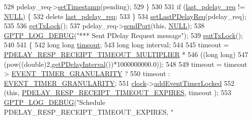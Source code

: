 \begin{DoxyCode}
528                 pdelay\_req->\hyperlink{class_p_t_p_message_common_aa35baf97ba1690eb11defa05a40f7d05}{setTimestamp}(pending);
529             \}
530 
531             \textcolor{keywordflow}{if} (\hyperlink{class_ether_port_a4300731ae1f9227ce6fc7beb3ec7154e}{last\_pdelay\_req} != \hyperlink{openavb__types__base__pub_8h_a070d2ce7b6bb7e5c05602aa8c308d0c4}{NULL}) \{
532                 \textcolor{keyword}{delete} \hyperlink{class_ether_port_a4300731ae1f9227ce6fc7beb3ec7154e}{last\_pdelay\_req};
533             \}
534             \hyperlink{class_ether_port_ab25cd9729b7a0cba720227a1f117609e}{setLastPDelayReq}(pdelay\_req);
535 
536             \hyperlink{class_ether_port_a0b26edd5fdba45bbfe2686051882a224}{getTxLock}();
537             pdelay\_req->\hyperlink{class_p_t_p_message_path_delay_req_a0c6f07200fa46634360d356ebb10dfe0}{sendPort}(\textcolor{keyword}{this}, \hyperlink{openavb__types__base__pub_8h_a070d2ce7b6bb7e5c05602aa8c308d0c4}{NULL});
538             \hyperlink{gptp__log_8hpp_ae4c6efe7c9cf6d7d3bbd28a0fd087d61}{GPTP\_LOG\_DEBUG}(\textcolor{stringliteral}{"*** Sent PDelay Request message"});
539             \hyperlink{class_ether_port_a43b92f952fdff70f6e8b5b8f4302c7d9}{putTxLock}();
540 
541             \{
542                 \textcolor{keywordtype}{long} \textcolor{keywordtype}{long} \hyperlink{aaf-listener_8c_a869c60cb165af7b6177060c00c5c416c}{timeout};
543                 \textcolor{keywordtype}{long} \textcolor{keywordtype}{long} interval;
544 
545                 timeout = \hyperlink{ether__port_8hpp_ae3d8888bc7a7c847c8d528fdabdbeecc}{PDELAY\_RESP\_RECEIPT\_TIMEOUT\_MULTIPLIER} *
546                     ((\textcolor{keywordtype}{long} long)
547                      (pow((\textcolor{keywordtype}{double})2,\hyperlink{class_common_port_a6b594b958b0887ec332bfb61bc5981c4}{getPDelayInterval}())*1000000000.0));
548 
549                 timeout = timeout > \hyperlink{avbts__clock_8hpp_a9fc7849128814495c7dccd06d5343baa}{EVENT\_TIMER\_GRANULARITY} ?
550                     timeout : \hyperlink{avbts__clock_8hpp_a9fc7849128814495c7dccd06d5343baa}{EVENT\_TIMER\_GRANULARITY};
551                 \hyperlink{class_common_port_aa2bc8731fa5aeb5b033feebc2b67258c}{clock}->\hyperlink{class_i_e_e_e1588_clock_a4747f09108bd78ecd68d58dad4358d77}{addEventTimerLocked}
552                     (\textcolor{keyword}{this}, \hyperlink{ieee1588_8hpp_a5667b805d857c6d28f83f6038a0272d3a972d3b6b32edcfdd72c3841ac03b656a}{PDELAY\_RESP\_RECEIPT\_TIMEOUT\_EXPIRES}, timeout 
      );
553                 \hyperlink{gptp__log_8hpp_ae4c6efe7c9cf6d7d3bbd28a0fd087d61}{GPTP\_LOG\_DEBUG}(\textcolor{stringliteral}{"Schedule PDELAY\_RESP\_RECEIPT\_TIMEOUT\_EXPIRES, "}

\end{DoxyCode}
